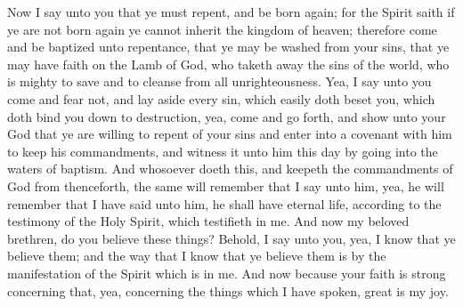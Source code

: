 Now I say unto you that ye must repent, and be born again; for the Spirit saith if ye are not born again ye cannot inherit the kingdom of heaven; therefore come and be baptized unto repentance, that ye may be washed from your sins, that ye may have faith on the Lamb of God, who taketh away the sins of the world, who is mighty to save and to cleanse from all unrighteousness.
\bverse \iffalse Yea, I say unto you come and fear not, and lay aside every sin, which easily doth beset you, which doth bind you down to destruction, yea, come and go forth, and show unto your God that ye are willing to repent of your sins and enter into a covenant with him to keep his commandments, and witness it unto him this day by going into the waters of baptism. \fi
Yea, I say unto you come and fear not, and lay aside every sin, which easily doth beset you, which doth bind you down to destruction, yea, come and go forth, and show unto your God that ye are willing to repent of your sins and enter into a covenant with him to keep his commandments, and witness it unto him this day by going into the waters of baptism.
\bverse \iffalse And whosoever doeth this, and keepeth the commandments of God from thenceforth, the same will remember that I say unto him, yea, he will remember that I have said unto him, he shall have eternal life, according to the testimony of the Holy Spirit, which testifieth in me. \fi
And whosoever doeth this, and keepeth the commandments of God from thenceforth, the same will remember that I say unto him, yea, he will remember that I have said unto him, he shall have eternal life, according to the testimony of the Holy Spirit, which testifieth in me.
\bverse \iffalse And now my beloved brethren, do you believe these things?  Behold, I say unto you, yea, I know that ye believe them; and the way that I know that ye believe them is by the manifestation of the Spirit which is in me. And now because your faith is strong concerning that, yea, concerning the things which I have spoken, great is my joy. \fi
And now my beloved brethren, do you believe these things?  Behold, I say unto you, yea, I know that ye believe them; and the way that I know that ye believe them is by the manifestation of the Spirit which is in me. And now because your faith is strong concerning that, yea, concerning the things which I have spoken, great is my joy.
\bverse \iffalse For as I said unto you from the beginning, that I had much desire that ye were not in the state of dilemma like your brethren, even so I have found that my desires have been gratified. \fi
